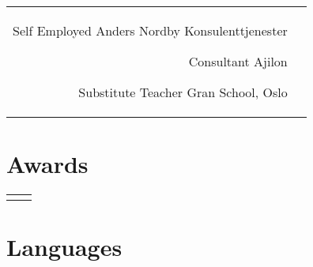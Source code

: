 \documentclass[10pt]{article} %
\begin{document}
\begin{paracol}{2}
\begin{supertabular}{rl}
	
	{Self Employed} %
	{} %
	{} %
	{Anders Nordby Konsulenttjenester} %
	
	{Consultant} %
	{} %
	{} %
	{Ajilon} %
	
	{Substitute Teacher} %
	{} %
	{} %
	{Gran School, Oslo} %
	

\end{supertabular}



\section{Awards}





\begin{supertabular}{rl} %
	
	
\end{supertabular}



\section{Languages} 


\end{paracol}
\end{document}
